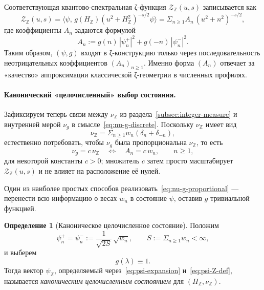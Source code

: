 \documentclass{article}
\numberwithin{equation}{section}
\theoremstyle{plain}
\theoremstyle{definition}
\newtheorem{definition}{Определение}
\theoremstyle{remark}
\def\delta{δ}\def\Delta{Δ}\def\epsilon{ε}\def\zeta{ζ}%
\def\infty{∞}\def\partial{∂}\def\sum{Σ}\def\int{∫}%
\begin{document}
Соответствующая квантово-спектральная ζ-функция
\(\mathcal Z_{\mathbb Z}(u,s)\) записывается как
\begin{equation}
\label{eq:Z-Z-discrete}
\mathcal Z_{\mathbb Z}(u,s)
=
\big\langle\psi,\,
g(H_{\mathbb Z})(u^2+H_{\mathbb Z}^2)^{-s/2}\psi\big\rangle
=
\sum_{n\ge 1} A_n\,(u^2+n^2)^{-s/2},
\end{equation}
где коэффициенты \(A_n\) задаются формулой
\begin{equation}
\label{eq:A-n-coeff}
A_n
:=
g(n)\,|\psi_n^+|^2 + g(-n)\,|\psi_n^-|^2.
\end{equation}
Таким образом, \((\psi,g)\) входят в ζ-конструкцию только через
последовательность неотрицательных коэффициентов \((A_n)_{n\ge 1}\).
Именно форма \((A_n)\) отвечает за «качество» аппроксимации
классической ζ-геометрии в численных профилях.

\paragraph{Канонический «целочисленный» выбор состояния.}
Зафиксируем теперь связи между \(\nu_{\mathbb Z}\) из
раздела~\ref{subsec:integer-measure} и внутренней мерой \(\nu_g\)
в смысле~\eqref{eq:nu-g-discrete}. Поскольку \(\nu_{\mathbb Z}\) имеет вид
\begin{equation}
\label{eq:nu-Z-recall}
\nu_{\mathbb Z}
=
\sum_{n\ge 1} w_n(\delta_n+\delta_{-n}),
\end{equation}
естественно потребовать, чтобы \(\nu_g\) была пропорциональна
\(\nu_{\mathbb Z}\), то есть
\begin{equation}
\label{eq:nu-g-proportional}
\nu_g = c\,\nu_{\mathbb Z}
\quad\Longleftrightarrow\quad
A_n = c\,w_n,\qquad n\ge 1,
\end{equation}
для некоторой константы \(c>0\); множитель \(c\) затем просто масштабирует
\(\mathcal Z_{\mathbb Z}(u,s)\) и не влияет на расположение её нулей.

Один из наиболее простых способов реализовать~\eqref{eq:nu-g-proportional}
— перенести всю информацию о весах \(w_n\) в состояние \(\psi\), оставив
\(g\) тривиальной функцией.

\begin{definition}[Каноническое целочисленное состояние]
\label{def:psi-Z}
Положим
\begin{equation}
\label{eq:psi-Z-def}
\psi_n^+
=
\psi_n^-
:=
\frac{1}{\sqrt{2S}}\,\sqrt{w_n},
\qquad
S:=\sum_{n\ge 1} w_n<\infty,
\end{equation}
и выберем
\begin{equation}
\label{eq:g-constant}
g(\lambda)\equiv 1.
\end{equation}
Тогда вектор \(\psi_{\mathbb Z}\), определяемый через~\eqref{eq:psi-expansion}
и~\eqref{eq:psi-Z-def}, называется \emph{каноническим целочисленным
состоянием} для \((H_{\mathbb Z},\nu_{\mathbb Z})\).
\end{definition}
\end{document}
